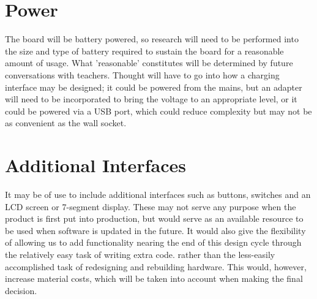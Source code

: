 \section{Power}
The board will be battery powered, so research will need to be performed into the size and type of battery required to sustain the board for a reasonable amount of usage. What 'reasonable' constitutes will be determined by future conversations with teachers. Thought will have to go into how a charging interface may be designed; it could be powered from the mains, but an adapter will need to be incorporated to bring the voltage to an appropriate level, or it could be powered via a USB port, which could reduce complexity but may not be as convenient as the wall socket.



\section{Additional Interfaces}
It may be of use to include additional interfaces such as buttons, switches and an LCD screen or 7-segment display. These may not serve any purpose when the product is first put into production, but would serve as an available resource to be used when software is updated in the future. It would also give the flexibility of allowing us to add functionality nearing the end of this design cycle through the relatively easy task of writing extra code. rather than the less-easily accomplished task of redesigning and rebuilding hardware. This would, however, increase material costs, which will be taken into account when making the final decision. 







